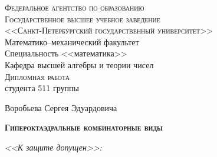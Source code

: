 
\thispagestyle{empty}

\begin{center}

        \textsc{Федеральное агентство по образованию}\\[0.2cm]

        \textsc{Государственное высшее учебное заведение \\
        <<Санкт-Петербургский государственный университет>>}\\[0.7cm]

        Математико--механический факультет \\[0.5cm]

        Специальность <<математика>>\\[0.7cm]

        Кафедра высшей алгебры и теории чисел\\[0.7cm]

        \textsc{Дипломная работа}\\[0.7cm]

		студента 511 группы
		
		Воробьева Сергея Эдуардовича\\[0.7cm]

        \begin{large}
                \textsc{\textbf{Гипероктаэдральные комбинаторные виды}}
        \end{large}

\end{center}

\vspace{0.7cm}

\textit{<<К защите допущен>>:}

